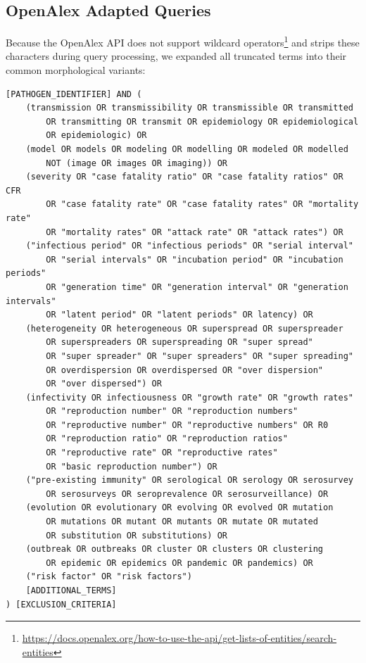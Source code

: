 \subsection{OpenAlex Adapted Queries}

Because the OpenAlex API does not support wildcard operators\footnote{\url{https://docs.openalex.org/how-to-use-the-api/get-lists-of-entities/search-entities}} and strips these characters during query processing, we expanded all truncated terms into their common morphological variants:

\begin{lstlisting}[basicstyle=\small\ttfamily, breaklines=true, backgroundcolor=\color{gray!10}]
[PATHOGEN_IDENTIFIER] AND (
    (transmission OR transmissibility OR transmissible OR transmitted 
        OR transmitting OR transmit OR epidemiology OR epidemiological 
        OR epidemiologic) OR 
    (model OR models OR modeling OR modelling OR modeled OR modelled 
        NOT (image OR images OR imaging)) OR 
    (severity OR "case fatality ratio" OR "case fatality ratios" OR CFR 
        OR "case fatality rate" OR "case fatality rates" OR "mortality rate" 
        OR "mortality rates" OR "attack rate" OR "attack rates") OR 
    ("infectious period" OR "infectious periods" OR "serial interval" 
        OR "serial intervals" OR "incubation period" OR "incubation periods" 
        OR "generation time" OR "generation interval" OR "generation intervals" 
        OR "latent period" OR "latent periods" OR latency) OR 
    (heterogeneity OR heterogeneous OR superspread OR superspreader 
        OR superspreaders OR superspreading OR "super spread" 
        OR "super spreader" OR "super spreaders" OR "super spreading" 
        OR overdispersion OR overdispersed OR "over dispersion" 
        OR "over dispersed") OR 
    (infectivity OR infectiousness OR "growth rate" OR "growth rates" 
        OR "reproduction number" OR "reproduction numbers" 
        OR "reproductive number" OR "reproductive numbers" OR R0 
        OR "reproduction ratio" OR "reproduction ratios" 
        OR "reproductive rate" OR "reproductive rates" 
        OR "basic reproduction number") OR 
    ("pre-existing immunity" OR serological OR serology OR serosurvey 
        OR serosurveys OR seroprevalence OR serosurveillance) OR 
    (evolution OR evolutionary OR evolving OR evolved OR mutation 
        OR mutations OR mutant OR mutants OR mutate OR mutated 
        OR substitution OR substitutions) OR 
    (outbreak OR outbreaks OR cluster OR clusters OR clustering 
        OR epidemic OR epidemics OR pandemic OR pandemics) OR 
    ("risk factor" OR "risk factors")
    [ADDITIONAL_TERMS]
) [EXCLUSION_CRITERIA]
\end{lstlisting}

